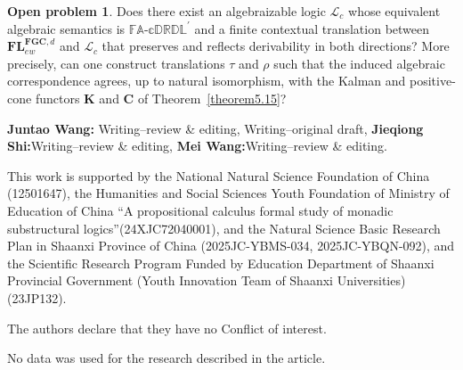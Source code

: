 \documentclass[final,12pt,times]{elsarticle}
\theoremstyle{plain}
\theoremstyle{definition}
\newtheorem{openproblem}[definition]{Open problem}
\theoremstyle{break}
\newcommand{\CFADp}{\mathbb{FA\text{-}cDRDL}^{\prime}}
\begin{document}
\begin{openproblem}\label{op:logical-Kalman-translation}
Does there exist an algebraizable logic $\mathcal L_c$ whose equivalent
algebraic semantics is $\CFADp$ and a finite contextual translation
between $\mathbf{FL}^{\mathbf{FGC},d}_{ew}$ and $\mathcal L_c$ that
preserves and reflects derivability in both directions? More precisely,
can one construct translations $\tau$ and $\rho$ such that the induced
algebraic correspondence agrees, up to natural isomorphism, with the
Kalman and positive-cone functors $\mathbf K$ and $\mathbf C$ of
Theorem~\ref{theorem5.15}?
\end{openproblem}
\medskip
{}
\medskip

\noindent \textbf{Juntao Wang:} Writing--review \& editing, Writing--original draft, \textbf{Jieqiong Shi:}Writing--review \& editing, \textbf{Mei Wang:}Writing--review \& editing.

\medskip
{} 
\medskip

This work is supported by the National Natural Science Foundation of China (12501647), the Humanities and Social Sciences Youth Foundation of Ministry of Education of China ``A propositional calculus formal study of monadic substructural logics''(24XJC72040001), and the Natural Science Basic Research Plan in Shaanxi Province of China (2025JC-YBMS-034, 2025JC-YBQN-092), and the Scientific Research Program Funded by Education Department of Shaanxi Provincial Government (Youth Innovation Team of Shaanxi Universities) (23JP132).

\medskip
{} 
\medskip

The authors declare that they have no Conflict of interest.

\medskip
{} 
\medskip

 No data was used for the research described in the article.
\end{document}
